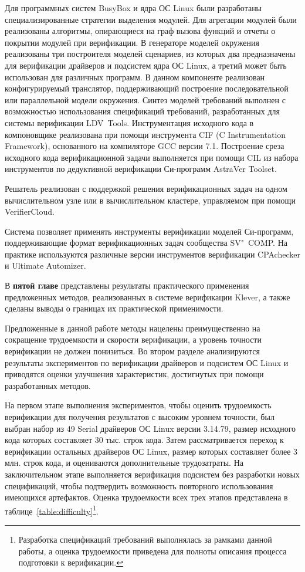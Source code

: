 \documentclass[%
autoref,
colorlinks,  
facsimile,   %
]{disser}
\begin{document}
Для программных систем BusyBox и ядра ОС Linux были разработаны специализированные стратегии выделения модулей.
Для агрегации модулей были реализованы алгоритмы, опирающиеся на граф вызова функций и отчеты о покрытии модулей при верификации.
В генераторе моделей окружения реализованы три построителя моделей сценариев, из которых два предназначены для верификации драйверов и подсистем ядра ОС Linux, а третий может быть использован для различных программ.
В данном компоненте реализован конфигурируемый транслятор, поддерживающий построение последовательной или параллельной модели окружения.
Синтез моделей требований выполнен с возможностью использования спецификаций требований, разработанных для системы верификации LDV~Tools.
Инструментация исходного кода в компоновщике реализована при помощи инструмента CIF (C Instrumentation Framework), основанного на компиляторе GCC версии 7.1.
Построение среза исходного кода верификационной задачи выполняется при помощи CIL из набора инструментов по дедуктивной верификации Си-программ AstraVer Toolset.

Решатель реализован с поддержкой решения верификационных задач на одном вычислительном узле или в вычислительном кластере, управляемом при помощи  VerifierCloud.

Система позволяет применять инструменты верификации моделей Си-программ, поддерживающие формат верификационных задач сообщества \break SV"~COMP.
На практике используются различные версии инструментов верификации CPAchecker и Ultimate Automizer.

В \textbf{пятой главе} представлены результаты практического применения предложенных методов, реализованных в системе верификации Klever, а также сделаны выводы о границах их практической применимости.

Предложенные в данной работе методы нацелены преимущественно на сокращение трудоемкости и скорости верификации, а уровень точности верификации не должен понизиться.
Во втором разделе анализируются результаты экспериментов по верификации драйверов и подсистем ОС Linux и приводятся оценки улучшения характеристик, достигнутых при помощи разработанных методов.

На первом этапе выполнения экспериментов, чтобы оценить трудоемкость верификации для получения результатов с высоким уровнем точности, был выбран набор из 49 Serial драйверов ОС Linux версии 3.14.79, размер исходного кода которых составляет 30 тыс. строк кода.
Затем рассматривается переход к верификации остальных драйверов ОС Linux, размер которых составляет более 3 млн. строк кода, и оцениваются дополнительные трудозатраты.
На заключительном этапе выполняется верификация подсистем без разработки новых спецификаций, чтобы подтвердить возможность повторного использования имеющихся артефактов.
Оценка трудоемкости всех трех этапов представлена в таблице~\ref{table:difficulty}\footnote{Разработка спецификаций требований выполнялась за рамками данной работы, а оценка трудоемкости приведена для полноты описания процесса подготовки к верификации.}.
 
\end{document}
